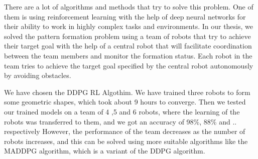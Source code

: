 \documentclass[12pt]{extarticle}
\begin{document}
There are a lot of algorithms and methods that try to solve this problem. One of them is using reinforcement learning with the help of deep neural networks for their ability to work in highly complex tasks and environments.
In our thesis, we solved the pattern formation problem using a team of robots that try to achieve their target goal with the help of a central robot that will facilitate coordination between the team members and monitor the formation status. Each robot in the team tries to achieve the target goal specified by the central robot autonomously by avoiding obstacles.


We have chosen the DDPG RL Algothim. We have trained three robots to form some geometric shapes, which took about 9 hours to converge.
Then we tested our trained models on a team of 4 ,5  and 6 robots, where the learning of the robots was transferred to them, and we got an accuracy of 98\%, 88\% and .. respectively
However, the performance of the team decreases as the number of robots increases, and this can be solved using more suitable algorithms like the MADDPG algorithm, which is a variant of the DDPG algorithm.







\newpage


\end{document}
